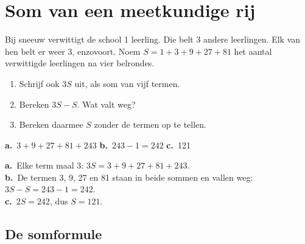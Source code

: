 \section{Som van een meetkundige rij}

\begin{oefeningen}
\begin{oefening}\label{oef:h3-mverken}
\quad Bij sneeuw verwittigt de school 1 leerling. Die belt 3 andere leerlingen. Elk van hen belt er weer 3, enzovoort. Noem $S = 1 + 3 + 9 + 27 + 81$ het aantal verwittigde leerlingen na vier belrondes.
\begin{enumerate}
  \item Schrijf ook $3S$ uit, als som van vijf termen.
  \item Bereken $3S - S$. Wat valt weg?
  \item Bereken daarmee $S$ zonder de termen op te tellen.
\end{enumerate}
\begin{solution}
\textbf{a.}~$3+9+27+81+243$ \quad \textbf{b.}~$243-1=242$ \quad \textbf{c.}~121
\end{solution}
\begin{fullsolution}
\textbf{a.}~Elke term maal 3: $3S=3+9+27+81+243$.\\
\textbf{b.}~De termen 3, 9, 27 en 81 staan in beide sommen en vallen weg: $3S-S=243-1=242$.\\
\textbf{c.}~$2S=242$, dus $S=121$.
\end{fullsolution}
\end{oefening}
\end{oefeningen}


\subsection{De somformule}

